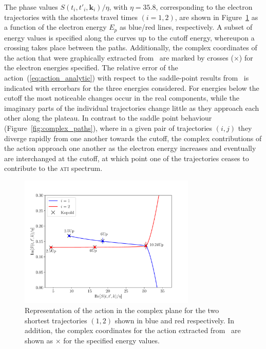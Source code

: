 The phase values $S(t_{i},t'_{i},\mathbf{k}_{i})/\eta$, with $\eta =
35.8$, corresponding to the electron trajectories with the shortests
travel times $(i = 1, 2)$, are shown in Figure~\ref{fig:phase_ReIm} as
a function of the electron energy $E_{p}$ as blue/red lines,
respectively. A subset of energy values is specified along the curves
up to the cutoff energy, whereupon a crossing takes place between the
paths. Additionally, the complex coordinates of the action that were
graphically extracted from~\cite{phd_Kopold} are marked by crosses
($\times$) for the electron energies specified. The relative error of
the action~(\ref{eq:action_analytic}) with respect to the saddle-point
results from~\cite{phd_Kopold} is indicated with errorbars for the
three energies considered. For energies below the cutoff the most
noticeable changes occur in the real components, while the imaginary
parts of the individual trajectories change little as they approach
each other along the plateau. In contrast to the saddle point
behaviour (Figure~\ref{fig:complex_paths}), where in a given pair of
trajectories $(i, j)$ they diverge rapidly from one another towards
the cutoff, the complex contributions of the action approach one
another as the electron energy increases and eventually are
interchanged at the cutoff, at which point one of the trajectories
ceases to contribute to the \textsc{ati} spectrum.

\begin{figure}
  \centering \includegraphics[width =
    0.75\textwidth]{figures/ch_ATI_SPA/rescattering/phase_ComplexReIm.pdf}
  \caption{Representation of the action in the complex plane for the
    two shortest trajectories $(1, 2)$ shown in blue and red
    respectively. In addition, the complex coordinates for the action
    extracted from~\cite{phd_Kopold} are shown as $\times$ for the
    specified energy values.}
  \label{fig:phase_ReIm}
\end{figure}

